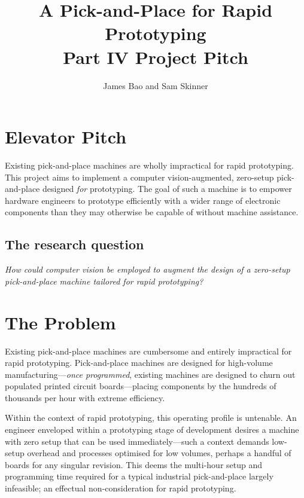 \documentclass [11pt]{article}
\title{A Pick-and-Place for Rapid Prototyping\\\medskip Part IV Project Pitch}
\author{James Bao and Sam Skinner}
\begin{document}
\maketitle

\section{Elevator Pitch}

Existing pick-and-place machines are wholly impractical for rapid prototyping.
This project aims to implement a computer vision-augmented, zero-setup pick-and-place designed \emph{for} prototyping.
The goal of such a machine is to empower hardware engineers to prototype efficiently with a wider range of electronic components than they may otherwise be capable of without machine assistance.

\subsection{The research question}

\emph{How could computer vision be employed to augment the design of a zero-setup pick-and-place machine tailored for rapid prototyping?}

\tableofcontents

\pagebreak
{}

\section{The Problem}

Existing pick-and-place machines are cumbersome and entirely impractical for rapid prototyping.
Pick-and-place machines are designed for high-volume manufacturing—\emph{once programmed}, existing machines are designed to churn out populated printed circuit boards—placing components by the hundreds of thousands per hour \cite{cite:ztar-ysm40r} with extreme efficiency.

Within the context of rapid prototyping, this operating profile is untenable.
An engineer enveloped within a prototyping stage of development desires a machine with zero setup that can be used immediately—such a context demands low-setup overhead and processes optimised for low volumes, perhaps a handful of boards for any singular revision.
This deems the multi-hour setup and programming time \cite{cite:setup-time-reduction} required for a typical industrial pick-and-place largely infeasible; an effectual non-consideration for rapid prototyping.
\end{document}
